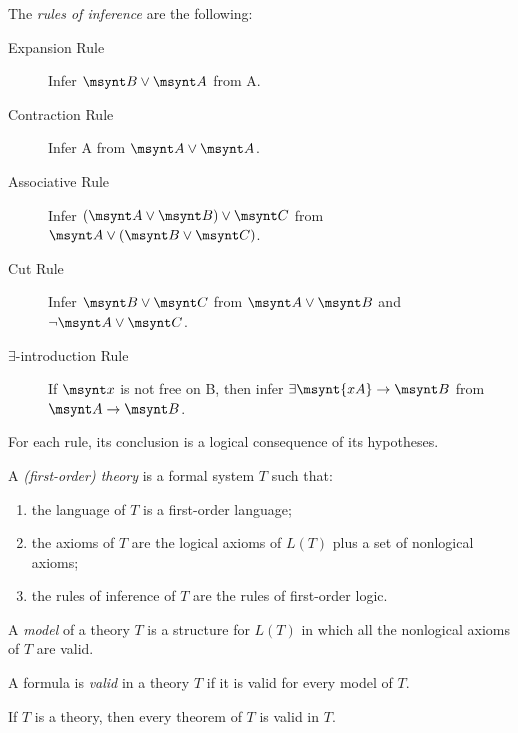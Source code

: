 \begin{definition}
	The \emph{rules of inference} are the following:
	\begin{description}
		\item[Expansion Rule] Infer $\msynt B \lor \msynt A$ from \synt A.
		\item[Contraction Rule] Infer \synt A from $\msynt A \lor \msynt A$.
		\item [Associative Rule] Infer $(\msynt A \lor \msynt B)\lor \msynt C$
		from $\msynt A \lor (\msynt B\lor \msynt C)$.
		\item [Cut Rule] Infer $\msynt B \lor \msynt C$ from 
		$\msynt A \lor \msynt B$ and $\lnot \msynt A \lor \msynt C$.
		\item [$\exists$-introduction Rule] If $\msynt x$ is not free on
		\synt B, then infer $\exists\msynt{xA}\to\msynt B$ from 
		$\msynt A \to\msynt B$.
	\end{description}
\end{definition}

\begin{fact}
	For each rule, its conclusion is a logical consequence of its hypotheses.
\end{fact}

\begin{definition}
	A \emph{(first-order) theory} is a formal system $T$ such that:
	\begin{enumerate}
		\item the language of $T$ is a first-order language;
		\item the axioms of $T$ are the logical axioms of $L(T)$ plus
		a set of nonlogical axioms;
		\item the rules of inference of $T$ are the rules of first-order
		logic.
	\end{enumerate}
\end{definition}

\begin{definition}
	A \emph{model} of a theory $T$ is a structure for $L(T)$ in which
	all the nonlogical axioms of $T$ are valid.
\end{definition}

\begin{definition}
	A formula is \emph{valid} in a theory $T$ if it is valid for every
	model of $T$.
\end{definition}

\begin{theorem}
	If $T$ is a theory, then every theorem of $T$ is valid in $T$.
\end{theorem}